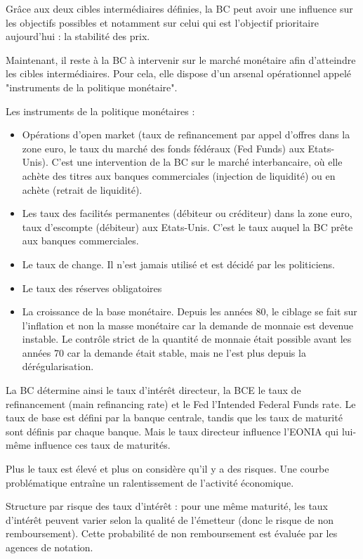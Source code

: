 Grâce aux deux cibles intermédiaires définies, la BC peut avoir une influence sur les objectifs possibles et notamment sur celui qui est l'objectif prioritaire aujourd'hui : la stabilité des prix.

Maintenant, il reste à la BC à intervenir sur le marché monétaire afin d'atteindre les cibles intermédiaires. Pour cela, elle dispose d'un arsenal opérationnel appelé "instruments de la politique monétaire".



Les instruments de la politique monétaires :

\begin{itemize}
	\item Opérations d'open market (taux de refinancement par appel d'offres dans la zone euro, le taux du marché des fonds fédéraux (Fed Funds) aux Etats-Unis). C'est une intervention de la BC sur le marché interbancaire, où elle achète des titres aux banques commerciales (injection de liquidité) ou en achète (retrait de liquidité).
	\item Les taux des facilités permanentes (débiteur ou créditeur) dans la zone euro, taux d'escompte (débiteur) aux Etats-Unis. C'est le taux auquel la BC prête aux banques commerciales.
	\item Le taux de change. Il n'est jamais utilisé et est décidé par les politiciens.
	\item Le taux des réserves obligatoires
	\item La croissance de la base monétaire. Depuis les années 80, le ciblage se fait sur l'inflation et non la masse monétaire car la demande de monnaie est devenue instable. Le contrôle strict de la quantité de monnaie était possible avant les années 70 car la demande était stable, mais ne l'est plus depuis la dérégularisation.
\end{itemize}


La BC détermine ainsi le taux d'intérêt directeur, la BCE le taux de refinancement (main refinancing rate) et le Fed l'Intended Federal Funds rate. Le taux de base est défini par la banque centrale, tandis que les taux de maturité sont définis par chaque banque. Mais le taux directeur influence l'EONIA qui lui-même influence ces taux de maturités.

Plus le taux est élevé et plus on considère qu'il y a des risques. Une courbe problématique entraîne un ralentissement de l'activité économique.

Structure par risque des taux d'intérêt : pour une même maturité, les taux d'intérêt peuvent varier selon la qualité de l'émetteur (donc le risque de non remboursement). Cette probabilité de non remboursement est évaluée par les agences de notation.
	
